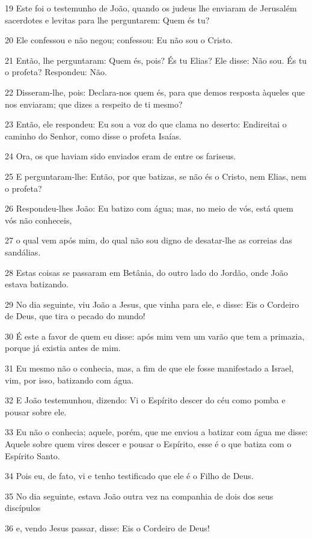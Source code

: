 \par 19 Este foi o testemunho de João, quando os judeus lhe enviaram de Jerusalém sacerdotes e levitas para lhe perguntarem: Quem és tu?
\par 20 Ele confessou e não negou; confessou: Eu não sou o Cristo.
\par 21 Então, lhe perguntaram: Quem és, pois? És tu Elias? Ele disse: Não sou. És tu o profeta? Respondeu: Não.
\par 22 Disseram-lhe, pois: Declara-nos quem és, para que demos resposta àqueles que nos enviaram; que dizes a respeito de ti mesmo?
\par 23 Então, ele respondeu: Eu sou a voz do que clama no deserto: Endireitai o caminho do Senhor, como disse o profeta Isaías.
\par 24 Ora, os que haviam sido enviados eram de entre os fariseus.
\par 25 E perguntaram-lhe: Então, por que batizas, se não és o Cristo, nem Elias, nem o profeta?
\par 26 Respondeu-lhes João: Eu batizo com água; mas, no meio de vós, está quem vós não conheceis,
\par 27 o qual vem após mim, do qual não sou digno de desatar-lhe as correias das sandálias.
\par 28 Estas coisas se passaram em Betânia, do outro lado do Jordão, onde João estava batizando.
\par 29 No dia seguinte, viu João a Jesus, que vinha para ele, e disse: Eis o Cordeiro de Deus, que tira o pecado do mundo!
\par 30 É este a favor de quem eu disse: após mim vem um varão que tem a primazia, porque já existia antes de mim.
\par 31 Eu mesmo não o conhecia, mas, a fim de que ele fosse manifestado a Israel, vim, por isso, batizando com água.
\par 32 E João testemunhou, dizendo: Vi o Espírito descer do céu como pomba e pousar sobre ele.
\par 33 Eu não o conhecia; aquele, porém, que me enviou a batizar com água me disse: Aquele sobre quem vires descer e pousar o Espírito, esse é o que batiza com o Espírito Santo.
\par 34 Pois eu, de fato, vi e tenho testificado que ele é o Filho de Deus.
\par 35 No dia seguinte, estava João outra vez na companhia de dois dos seus discípulos
\par 36 e, vendo Jesus passar, disse: Eis o Cordeiro de Deus!

